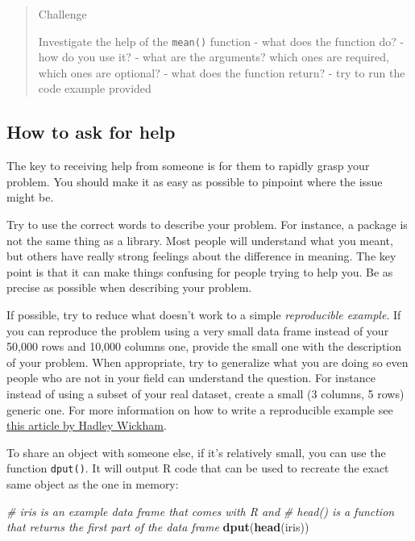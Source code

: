 \documentclass[
]{book}
\newenvironment{Shaded}{\begin{snugshade}}{\end{snugshade}}
\newcommand{\CommentTok}[1]{\textcolor[rgb]{0.56,0.35,0.01}{\textit{#1}}}
\newcommand{\FunctionTok}[1]{\textcolor[rgb]{0.13,0.29,0.53}{\textbf{#1}}}
\newcommand{\NormalTok}[1]{#1}
\begin{document}
\begin{quote}
Challenge

Investigate the help of the \texttt{mean()} function
- what does the function do?
- how do you use it?
- what are the arguments? which ones are required, which ones are optional?
- what does the function return?
- try to run the code example provided
\end{quote}

\subsection{How to ask for help}\label{how-to-ask-for-help}

The key to receiving help from someone is for them to rapidly grasp your
problem. You should make it as easy as possible to pinpoint where the issue
might be.

Try to use the correct words to describe your problem. For instance, a package
is not the same thing as a library. Most people will understand what you meant,
but others have really strong feelings about the difference in meaning. The key
point is that it can make things confusing for people trying to help you. Be as
precise as possible when describing your problem.

If possible, try to reduce what doesn't work to a simple \emph{reproducible
example}. If you can reproduce the problem using a very small data frame
instead of your 50,000 rows and 10,000 columns one, provide the small one with
the description of your problem. When appropriate, try to generalize what you
are doing so even people who are not in your field can understand the
question. For instance instead of using a subset of your real dataset, create a
small (3 columns, 5 rows) generic one. For more information on how to write a
reproducible example see \href{http://adv-r.had.co.nz/Reproducibility.html}{this article by Hadley Wickham}.

To share an object with someone else, if it's relatively small, you can use the
function \texttt{dput()}. It will output R code that can be used to recreate the exact
same object as the one in memory:

\begin{Shaded}
\begin{Highlighting}[]
\CommentTok{\# iris is an example data frame that comes with R and }
\CommentTok{\# head() is a function that returns the first part of the data frame}
\FunctionTok{dput}\NormalTok{(}\FunctionTok{head}\NormalTok{(iris)) }
\end{Highlighting}
\end{Shaded}
\end{document}
